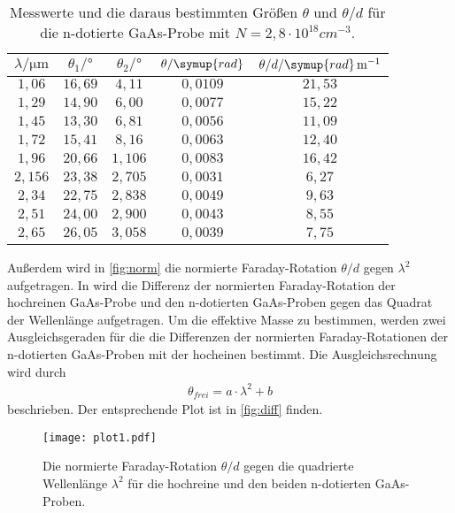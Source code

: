 \begin{table}[hbt!]
  \centering
  \caption{Messwerte und die daraus bestimmten Größen $\theta$ und $\theta/d$ für die n-dotierte GaAs-Probe
  mit $N=2,8 \cdot 10^{18} \si{cm}^{-3}$.}
  \label{tab:m3}
  \begin{tabular}{c c c c c}
    \toprule
    $\lambda/\si{\micro\meter}$ & $\theta_{1}/\si{\degree}$ & $\theta_{2}/\si{\degree}$ & $\theta/\symup{rad}$ & $\theta/d/\symup{rad}\, \si{m}^{-1}$\\
    \midrule
    $1,06 $ & $16,69$ & $4,11$  & $0,0109$ & $21,53$ \\
    $1,29 $ & $14,90$ & $6,00$  & $0,0077$ & $15,22$ \\
    $1,45 $ & $13,30$ & $6,81$  & $0,0056$ & $11,09$ \\
    $1,72 $ & $15,41$ & $8,16$  & $0,0063$ & $12,40$ \\
    $1,96 $ & $20,66$ & $1,106$ & $0,0083$ & $16,42$ \\
    $2,156$ & $23,38$ & $2,705$ & $0,0031$ & $ 6,27$ \\
    $2,34 $ & $22,75$ & $2,838$ & $0,0049$ & $ 9,63$ \\
    $2,51 $ & $24,00$ & $2,900$ & $0,0043$ & $ 8,55$ \\
    $2,65 $ & $26,05$ & $3,058$ & $0,0039$ & $ 7,75$ \\
    \bottomrule
  \end{tabular}
\end{table}
Außerdem wird in \autoref{fig:norm} die normierte Faraday-Rotation $\theta/d$ gegen $\lambda^2$ aufgetragen.
In wird die Differenz der normierten Faraday-Rotation der hochreinen GaAs-Probe und den n-dotierten GaAs-Proben
gegen das Quadrat der Wellenlänge aufgetragen. Um die effektive Masse zu bestimmen, werden zwei Ausgleichsgeraden
für die die Differenzen der normierten Faraday-Rotationen der n-dotierten GaAs-Proben mit der hocheinen bestimmt.
Die Ausgleichsrechnung wird durch
\begin{align*}
  \theta_{frei} = a\cdot \lambda^2 + b
\end{align*}
beschrieben.
Der entsprechende Plot ist in \autoref{fig:diff} finden.
\begin{figure}[hbt!]
  \label{fig:norm}
  \texttt{[image: plot1.pdf]}
  \caption{Die normierte Faraday-Rotation $\theta/d$ gegen die quadrierte Wellenlänge $\lambda^2$ für die
  hochreine und den beiden n-dotierten GaAs-Proben.}
\end{figure}

